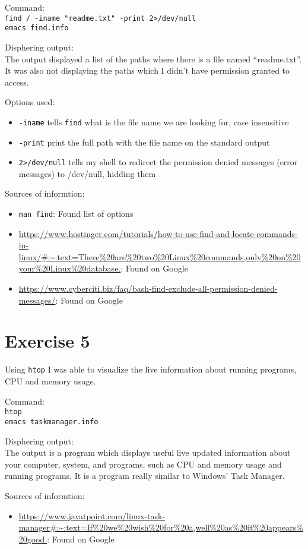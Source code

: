 \documentclass{article}
\begin{document}
Command:\\
\texttt{find / -iname "readme.txt" -print 2>/dev/null}\\
\texttt{emacs find.info}

Disphering output:\\
The output displayed a list of the paths where there is a file named ``readme.txt''. It was also not displaying the paths which I didn't have permission granted to access. 

Options used:
\begin{itemize}
    \item{\texttt{-iname} tells \texttt{find} what is the file name we are looking for, case insensitive}
    \item{\texttt{-print} print the full path with the file name on the standard output}
    \item{\texttt{2>/dev/null} tells my shell to redirect the permission denied messages (error messages) to /dev/null, hidding them}
\end{itemize}

Sources of informtion:
\begin{itemize}
    \item{\texttt{man find}: Found list of options}
    \item{\url{https://www.hostinger.com/tutorials/how-to-use-find-and-locate-commands-in-linux/#:~:text=There%20are%20two%20Linux%20commands,only%20on%20your%20Linux%20database.}: Found on Google}
    \item{\url{https://www.cyberciti.biz/faq/bash-find-exclude-all-permission-denied-messages/}: Found on Google}
\end{itemize}

\newpage
\section{Exercise 5}
Using \texttt{htop} I was able to visualize the live information about running programs, CPU and memory usage.

Command:\\
\texttt{htop}\\
\texttt{emacs taskmanager.info}

Disphering output:\\
The output is a program which displays useful live updated information about your computer, system, and programs, such as CPU and memory usage and running programs. It is a program really similar to Windows' Task Manager.

Sources of informtion:
\begin{itemize}
    \item{\url{https://www.javatpoint.com/linux-task-manager#:~:text=If%20we%20wish%20for%20a,well%20as%20it%20appears%20good.}: Found on Google}
\end{itemize}
\end{document}
